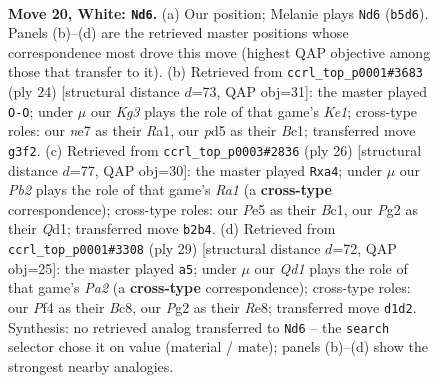 \documentclass[11pt]{article}
\begin{document}
\begin{figure}[p]
\label{fig:thought-m36}
\end{figure}

\clearpage

\begin{figure}[p]\centering
\begin{subfigure}{0.46\textwidth}\centering
\resizebox{\linewidth}{!}{%
\newchessgame
\chessboard[
  setfen={1nb1qrk1/1r2nppp/4p3/1NppP3/p4P2/6K1/PPP3PP/R2Q1BNR w - - 0 20},
  showmover=false,
  pgfstyle=straightmove, color=movearrow, markmove={b5-d6}
]}
\caption{}
\end{subfigure}\hfill
\begin{subfigure}{0.46\textwidth}\centering
\resizebox{\linewidth}{!}{%
\newchessgame
\chessboard[
  setfen={r2qkb1r/1b1n1pp1/p2p4/1p1Np3/4P2p/6PP/PPP2PB1/R1BQK2R w KQkq - 0 13},
  showmover=false,
  pgfstyle=straightmove, color=movearrow, markmove={e1-g1}
]}
\caption{}
\end{subfigure}
\\[4pt]
\begin{subfigure}{0.46\textwidth}\centering
\resizebox{\linewidth}{!}{%
\newchessgame
\chessboard[
  setfen={r1bq1rk1/3nbppp/p2p4/3Np3/p3P3/6P1/1PP2PBP/R1BQK2R w KQ - 0 14},
  showmover=false,
  pgfstyle=straightmove, color=movearrow, markmove={a1-a4}
]}
\caption{}
\end{subfigure}\hfill
\begin{subfigure}{0.46\textwidth}\centering
\resizebox{\linewidth}{!}{%
\newchessgame
\chessboard[
  setfen={r1b1r1k1/pp1nqpp1/2p4p/4p3/3P4/4PN2/PPQ1BPPP/2R2RK1 b - - 3 15},
  showmover=false,
  pgfstyle=straightmove, color=movearrow, markmove={a7-a5}
]}
\caption{}
\end{subfigure}
\caption{\textbf{Move 20, White: \texttt{Nd6}.} (a) Our position; Melanie plays \texttt{Nd6} (\texttt{b5d6}). Panels (b)--(d) are the retrieved master positions whose correspondence most drove this move (highest QAP objective among those that transfer to it). (b) Retrieved from \texttt{ccrl\_top\_p0001\#3683} (ply 24) [structural distance $d$=73, QAP obj=31]: the master played \texttt{O-O}; under $\mu$ our \emph{Kg3} plays the role of that game's \emph{Ke1}; cross-type roles: our \emph{n}e7 as their \emph{R}a1, our \emph{p}d5 as their \emph{B}c1; transferred move \texttt{g3f2}. (c) Retrieved from \texttt{ccrl\_top\_p0003\#2836} (ply 26) [structural distance $d$=77, QAP obj=30]: the master played \texttt{Rxa4}; under $\mu$ our \emph{Pb2} plays the role of that game's \emph{Ra1} (a \textbf{cross-type} correspondence); cross-type roles: our \emph{P}e5 as their \emph{B}c1, our \emph{P}g2 as their \emph{Q}d1; transferred move \texttt{b2b4}. (d) Retrieved from \texttt{ccrl\_top\_p0001\#3308} (ply 29) [structural distance $d$=72, QAP obj=25]: the master played \texttt{a5}; under $\mu$ our \emph{Qd1} plays the role of that game's \emph{Pa2} (a \textbf{cross-type} correspondence); cross-type roles: our \emph{P}f4 as their \emph{B}c8, our \emph{P}g2 as their \emph{R}e8; transferred move \texttt{d1d2}. Synthesis: no retrieved analog transferred to \texttt{Nd6} -- the \texttt{search} selector chose it on value (material / mate); panels (b)--(d) show the strongest nearby analogies.}
\label{fig:thought-m38}
\end{figure}
\end{document}
